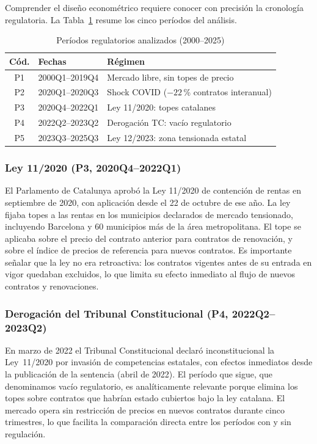 \documentclass[10pt,a4paper,twocolumn]{article}
\begin{document}
Comprender el diseño econométrico requiere conocer con precisión la cronología
regulatoria. La Tabla~\ref{tab:cronologia} resume los cinco períodos del análisis.

\begin{table}[!t]
\caption{Períodos regulatorios analizados (2000--2025)}
\label{tab:cronologia}
\centering\small
\begin{tabular}{clp{4.2cm}}
\toprule
Cód. & Fechas & Régimen \\
\midrule
P1 & 2000Q1--2019Q4 & Mercado libre, sin topes de precio \\
P2 & 2020Q1--2020Q3 & Shock COVID ($-22$\,\% contratos interanual) \\
P3 & 2020Q4--2022Q1 & Ley 11/2020: topes catalanes \\
P4 & 2022Q2--2023Q2 & Derogación TC: vacío regulatorio \\
P5 & 2023Q3--2025Q3 & Ley 12/2023: zona tensionada estatal \\
\bottomrule
\end{tabular}
\end{table}

\subsubsection*{Ley 11/2020 (P3, 2020Q4--2022Q1)}

El Parlamento de Catalunya aprobó la Ley 11/2020 de contención de rentas en
septiembre de 2020, con aplicación desde el 22 de octubre de ese año. La ley
fijaba topes a las rentas en los municipios declarados de mercado tensionado,
incluyendo Barcelona y 60 municipios más de la área metropolitana. El tope se
aplicaba sobre el precio del contrato anterior para contratos de renovación,
y sobre el índice de precios de referencia para nuevos contratos. Es importante
señalar que la ley no era retroactiva: los contratos vigentes antes de su entrada
en vigor quedaban excluidos, lo que limita su efecto inmediato al flujo de nuevos
contratos y renovaciones.

\subsubsection*{Derogación del Tribunal Constitucional (P4, 2022Q2--2023Q2)}

En marzo de 2022 el Tribunal Constitucional declaró inconstitucional la Ley~11/2020
por invasión de competencias estatales, con efectos inmediatos desde la publicación
de la sentencia (abril de 2022). El período que sigue, que denominamos vacío
regulatorio, es analíticamente relevante porque elimina los topes sobre contratos
que habrían estado cubiertos bajo la ley catalana. El mercado opera sin restricción
de precios en nuevos contratos durante cinco trimestres, lo que facilita la
comparación directa entre los períodos con y sin regulación.
\end{document}
